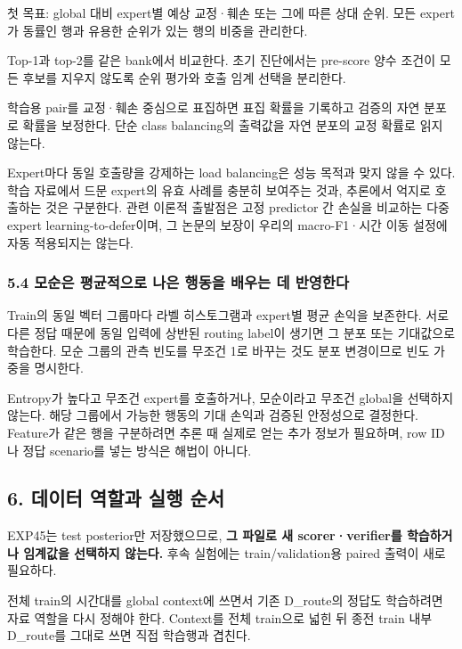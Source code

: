 \par\noindent \textbullet\enspace 첫 목표: global 대비 expert별 예상 교정·훼손 또는 그에 따른 상대 순위. 모든 expert가 동률인 행과 유용한 순위가 있는 행의 비중을 관리한다.


\par\noindent \textbullet\enspace Top-1과 top-2를 같은 bank에서 비교한다. 초기 진단에서는 pre-score 양수 조건이 모든 후보를 지우지 않도록 순위 평가와 호출 임계 선택을 분리한다.


\par\noindent \textbullet\enspace 학습용 pair를 교정·훼손 중심으로 표집하면 표집 확률을 기록하고 검증의 자연 분포로 확률을 보정한다. 단순 class balancing의 출력값을 자연 분포의 교정 확률로 읽지 않는다.


Expert마다 동일 호출량을 강제하는 load balancing은 성능 목적과 맞지 않을 수 있다. 학습 자료에서 드문 expert의 유효 사례를 충분히 보여주는 것과, 추론에서 억지로 호출하는 것은 구분한다. 관련 이론적 출발점은 고정 predictor 간 손실을 비교하는 다중 expert learning-to-defer이며, 그 논문의 보장이 우리의 macro-F1·시간 이동 설정에 자동 적용되지는 않는다.

\subsubsection{5.4 모순은 평균적으로 나은 행동을 배우는 데 반영한다}
Train의 동일 벡터 그룹마다 라벨 히스토그램과 expert별 평균 손익을 보존한다. 서로 다른 정답 때문에 동일 입력에 상반된 routing label이 생기면 그 분포 또는 기대값으로 학습한다. 모순 그룹의 관측 빈도를 무조건 1로 바꾸는 것도 분포 변경이므로 빈도 가중을 명시한다.

Entropy가 높다고 무조건 expert를 호출하거나, 모순이라고 무조건 global을 선택하지 않는다. 해당 그룹에서 가능한 행동의 기대 손익과 검증된 안정성으로 결정한다. Feature가 같은 행을 구분하려면 추론 때 실제로 얻는 추가 정보가 필요하며, row ID나 정답 scenario를 넣는 방식은 해법이 아니다.

\subsection{6. 데이터 역할과 실행 순서}
EXP45는 test posterior만 저장했으므로, \textbf{그 파일로 새 scorer·verifier를 학습하거나 임계값을 선택하지 않는다.} 후속 실험에는 train/\allowbreak{}validation용 paired 출력이 새로 필요하다.

전체 train의 시간대를 global context에 쓰면서 기존 D\_\allowbreak{}route의 정답도 학습하려면 자료 역할을 다시 정해야 한다. Context를 전체 train으로 넓힌 뒤 종전 train 내부 D\_\allowbreak{}route를 그대로 쓰면 직접 학습행과 겹친다.

